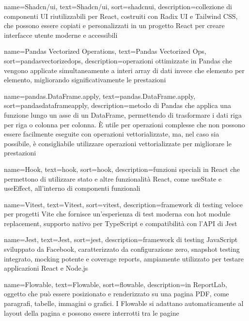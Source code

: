  {
    name=Shadcn/ui,
    text=Shadcn/ui,
    sort=shadcnui,
    description={collezione di componenti UI riutilizzabili per React, costruiti con Radix UI e Tailwind CSS, che possono essere copiati e personalizzati in un progetto React per creare interfacce utente moderne e accessibili}
}

 {
    name=Pandas Vectorized Operations,
    text=Pandas Vectorized Ops,
    sort=pandasvectorizedops,
    description={operazioni ottimizzate in Pandas che vengono applicate simultaneamente a interi array di dati invece che elemento per elemento, migliorando significativamente le prestazioni}
}

 {
    name=pandas.DataFrame.apply,
    text=pandas.DataFrame.apply,
    sort=pandasdataframeapply,
    description={metodo di Pandas che applica una funzione lungo un asse di un DataFrame, permettendo di trasformare i dati riga per riga o colonna per colonna. È utile per operazioni complesse che non possono essere facilmente eseguite con operazioni vettorializzate, ma, nel caso sia possibile, è consigliabile utilizzare operazioni vettorializzate per migliorare le prestazioni}
}

 {
    name=Hook,
    text=hook,
    sort=hook,
    description={funzioni speciali in React che permettono di utilizzare stato e altre funzionalità React, come useState e useEffect, all'interno di componenti funzionali}
}

 {
    name=Vitest,
    text=Vitest,
    sort=vitest,
    description={framework di testing veloce per progetti Vite che fornisce un'esperienza di test moderna con hot module replacement, supporto nativo per TypeScript e compatibilità con l'API di Jest}
}

 {
    name=Jest,
    text=Jest,
    sort=jest,
    description={framework di testing JavaScript sviluppato da Facebook, caratterizzato da configurazione zero, snapshot testing integrato, mocking potente e coverage reports, ampiamente utilizzato per testare applicazioni React e Node.js}
}

 {
    name=Flowable,
    text=Flowable,
    sort=flowable,
    description={in ReportLab, oggetto che può essere posizionato e renderizzato su una pagina PDF, come paragrafi, tabelle, immagini o grafici. I Flowable si adattano automaticamente al layout della pagina e possono essere interrotti tra le pagine}
}

